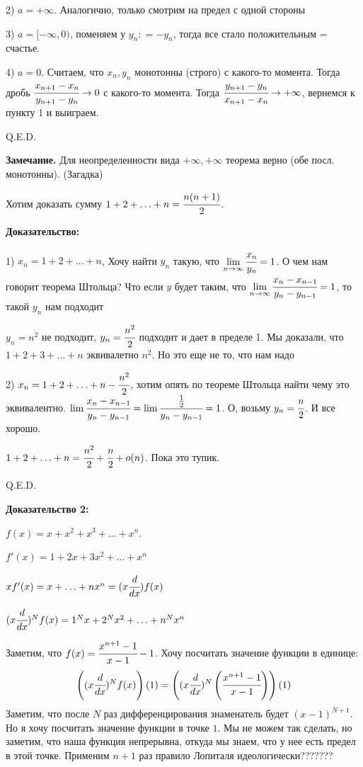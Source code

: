 2) $a = +\infty$. Аналогично, только смотрим на предел с одной стороны

3) $a = [-\infty, 0 )$, поменяем у $y_n: = -y_n$, тогда все стало положительным = счастье.

4) $a = 0$. Считаем, что $x_n, y_n$ монотонны (строго) с какого-то момента. Тогда дробь $\cfrac{x_{n+1}-x_n}{y_{n+1}-y_n} \rightarrow 0 $ с какого-то момента. Тогда  $\cfrac{y_{n+1}-y_n}{x_{n+1}-x_n} \rightarrow +\infty $, вернемся к пункту 1 и выиграем.

\hfill Q.E.D.

\textbf{Замечание.} Для неопределенности вида $+\infty,+\infty$ теорема верно (обе посл. монотонны). (Загадка)


Хотим доказать сумму $1 + 2 + \ldots + n = \cfrac{n(n+1)}{2}$.

\textbf{Доказательство:}

1) $x_n = 1 + 2 + \ldots + n$, Хочу найти $y_n$ такую, что
$\lim\limits_{n\rightarrow \infty} \cfrac{x_n}{y_n} = 1$. О чем нам говорит теорема Штольца? Что если $y$ будет таким, что $\lim\limits_{n\rightarrow \infty} \cfrac{x_{n}-x_{n-1}}{y_{n}-y_{n-1}} = 1$, то такой $y_n$ нам подходит

$y_n = n^2$ не подходит, $y_n = \cfrac{n^2}{2}$ подходит и дает в пределе 1. 
Мы доказали, что $1+2+3 +\ldots + n $ эквивалетно $n^2$. Но это еще не то, что нам надо

2) $x_n = 1+2+\ldots + n -\cfrac{n^2}{2}$, хотим опять по теореме Штольца найти чему это эквивалентно. $\lim \cfrac{x_n-x_{n-1}}{y_n-y_{n-1}} = \lim \cfrac{\frac{1}{2}}{y_n-y_{n-1}}=1$. О, возьму $y_n = \cfrac{n}{2}$. И все хорошо.

$1 + 2 + \ldots + n = \cfrac{n^2}{2} + \cfrac{n}{2} + o(n)$. Пока это тупик.

\hfill Q.E.D.

\textbf{Доказательство 2:}

$f(x) = x + x^2 + x^3 +\ldots + x^n$.

$f'(x) = 1 + 2x + 3x^2 + \ldots +x^n$

$xf'(x) = x + \ldots + nx^n  = (x\cfrac{d}{dx})f(x)$

$(x\cfrac{d}{dx})^Nf(x) = 1^Nx +2^Nx^2 +\ldots +n^Nx^n $

Заметим, что $f(x) = \cfrac{x^{n+1}-1}{x-1}-1$. Хочу посчитать значение функции в единице:
$$\left((x\cfrac{d}{dx})^Nf(x)\right)(1) =\left((x\cfrac{d}{dx})^N \left(\cfrac{x^{n+1}-1}{x-1}\right)\right)(1)$$
Заметим, что после $N$ раз дифференцирования знаменатель будет $(x-1)^{N+1}$. Но я хочу посчитать значение функции в точке $1$. Мы не можем так сделать, но заметим, что наша функция непрерывна, откуда мы знаем, что у нее есть предел  в этой точке. Применим $n+1$ раз правило Лопиталя идеологически??????? 

